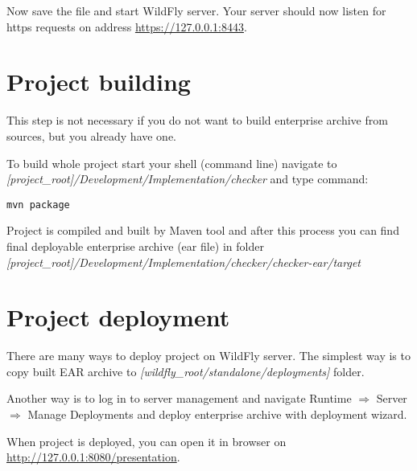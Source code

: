 \documentclass[12pt,a4paper]{article}
\begin{document}
Now save the file and start WildFly server. Your server should now listen for https requests on address \url{https://127.0.0.1:8443}.

\section{Project building}
This step is not necessary if you do not want to build enterprise archive from sources, but you already have one.

To build whole project start your shell (command line) navigate to \\\textit{[project\_root]/Development/Implementation/checker} and type command:
\begin{lstlisting}
mvn package
\end{lstlisting}

Project is compiled and built by Maven tool and after this process you can find final deployable enterprise archive (ear file) in folder \\\textit{[project\_root]/Development/Implementation/checker/checker-ear/target}

\section{Project deployment}
There are many ways to deploy project on WildFly server. The simplest way is to copy built EAR archive to \textit{[wildfly\_root/standalone/deployments]} folder. 

Another way is to log in to server management and navigate Runtime $\Rightarrow$ Server $\Rightarrow$ Manage Deployments and deploy enterprise archive with deployment wizard.

When project is deployed, you can open it in browser on \\\url{http://127.0.0.1:8080/presentation}.
\end{document}

